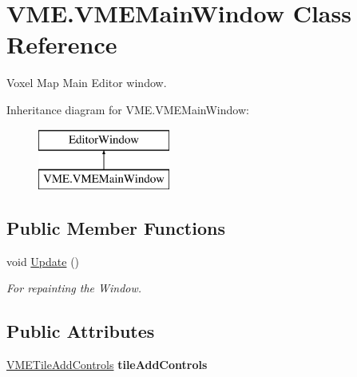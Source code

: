\hypertarget{class_v_m_e_1_1_v_m_e_main_window}{}\section{V\+M\+E.\+V\+M\+E\+Main\+Window Class Reference}
\label{class_v_m_e_1_1_v_m_e_main_window}


Voxel Map Main Editor window.  


Inheritance diagram for V\+M\+E.\+V\+M\+E\+Main\+Window\+:\begin{figure}[H]
\begin{center}
\leavevmode
\includegraphics[height=2.000000cm]{class_v_m_e_1_1_v_m_e_main_window}
\end{center}
\end{figure}
\subsection*{Public Member Functions}
\begin{DoxyCompactItemize}
\item 
void \hyperlink{class_v_m_e_1_1_v_m_e_main_window_a066a36f1875066fb5ae745332222384c}{Update} ()
\begin{DoxyCompactList}\small\item\em For repainting the Window. \end{DoxyCompactList}\end{DoxyCompactItemize}
\subsection*{Public Attributes}
\begin{DoxyCompactItemize}
\item 
\hyperlink{class_v_m_e_tile_add_controls}{V\+M\+E\+Tile\+Add\+Controls} {\bfseries tile\+Add\+Controls}\hypertarget{class_v_m_e_1_1_v_m_e_main_window_a885b7fd4d66956f67e76766594280adf}{}\label{class_v_m_e_1_1_v_m_e_main_window_a885b7fd4d66956f67e76766594280adf}

\end{DoxyCompactItemize}

